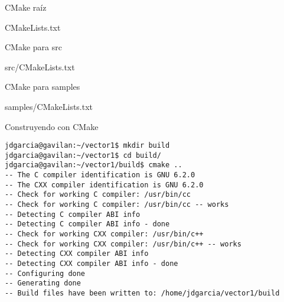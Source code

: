 \begin{frame}[t]{CMake raíz}
\vspace{-1em}
\begin{block}{CMakeLists.txt}

\end{block}
\end{frame}

\begin{frame}[t]{CMake para src}
\begin{block}{src/CMakeLists.txt}

\end{block}
\end{frame}

\begin{frame}[t]{CMake para samples}
\begin{block}{samples/CMakeLists.txt}

\end{block}
\end{frame}

\begin{frame}[t,fragile]{Construyendo con CMake}
\begin{lstlisting}[style=terminal,basicstyle=\tiny\ttfamily]
jdgarcia@gavilan:~/vector1$ mkdir build
jdgarcia@gavilan:~/vector1$ cd build/
jdgarcia@gavilan:~/vector1/build$ cmake ..
-- The C compiler identification is GNU 6.2.0
-- The CXX compiler identification is GNU 6.2.0
-- Check for working C compiler: /usr/bin/cc
-- Check for working C compiler: /usr/bin/cc -- works
-- Detecting C compiler ABI info
-- Detecting C compiler ABI info - done
-- Check for working CXX compiler: /usr/bin/c++
-- Check for working CXX compiler: /usr/bin/c++ -- works
-- Detecting CXX compiler ABI info
-- Detecting CXX compiler ABI info - done
-- Configuring done
-- Generating done
-- Build files have been written to: /home/jdgarcia/vector1/build
\end{lstlisting}
\end{frame}

